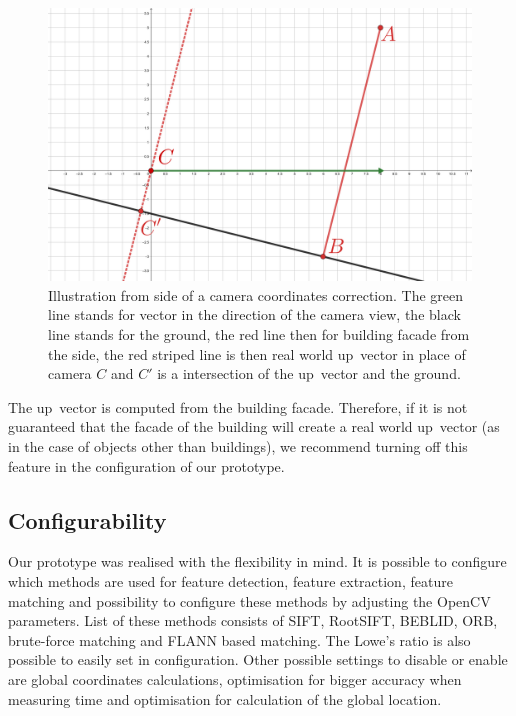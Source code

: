 \documentclass[thesis=B,english]{FITthesis}[2019/12/23]
\begin{document}
                \begin{figure}
                    \centering
                    \includegraphics[width = 0.8\linewidth] {pictures/realisation/standingPersonProblem.jpg}
                    \caption[Illustration from side of a camera coordinates correction.]{Illustration from side of a camera coordinates correction. The green line stands for vector in the direction of the camera view, the black line stands for the ground, the red line then for building facade from the side, the red striped line is then real world up~vector in place of camera \(C\) and \(C'\) is a intersection of the up~vector and the ground.}
                    \label{fig:standingPersonProblem}
                \end{figure}
                
                The up~vector is computed from the building facade. Therefore, if it is not guaranteed that the facade of the building will create a real world up~vector (as in the case of objects other than buildings), we recommend turning off this feature in the configuration of our prototype.
                
        \subsection{Configurability}
            Our prototype was realised with the flexibility in mind. It is possible to configure which methods are used for feature detection, feature extraction, feature matching and possibility to configure these methods by adjusting the OpenCV parameters. List of these methods consists of SIFT, RootSIFT, BEBLID, ORB, brute-force matching and FLANN based matching. The Lowe's ratio is also possible to easily set in configuration. Other possible settings to disable or enable are global coordinates calculations, optimisation for bigger accuracy when measuring time and optimisation for calculation of the global location.
                
\end{document}
